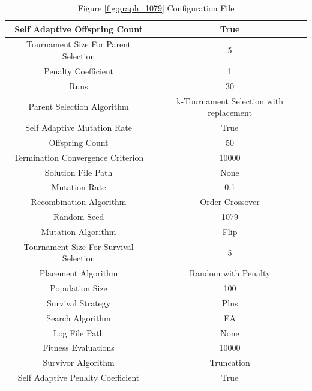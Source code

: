 \documentclass{standalone}
\begin{document}
\begin{table}[!htb]
	\centering
	\caption{Figure \ref{fig:graph_1079} Configuration File}
	\label{tab:graph_1079}
	\begin{tabular}{| c | c |}
		\hline
		Self Adaptive Offspring Count		& True		 \\
		\hline
		Tournament Size For Parent Selection		& 5		 \\
		\hline
		Penalty Coefficient		& 1		 \\
		\hline
		Runs		& 30		 \\
		\hline
		Parent Selection Algorithm		& k-Tournament Selection with replacement		 \\
		\hline
		Self Adaptive Mutation Rate		& True		 \\
		\hline
		Offspring Count		& 50		 \\
		\hline
		Termination Convergence Criterion		& 10000		 \\
		\hline
		Solution File Path		& None		 \\
		\hline
		Mutation Rate		& 0.1		 \\
		\hline
		Recombination Algorithm		& Order Crossover		 \\
		\hline
		Random Seed		& 1079		 \\
		\hline
		Mutation Algorithm		& Flip		 \\
		\hline
		Tournament Size For Survival Selection		& 5		 \\
		\hline
		Placement Algorithm		& Random with Penalty		 \\
		\hline
		Population Size		& 100		 \\
		\hline
		Survival Strategy		& Plus		 \\
		\hline
		Search Algorithm		& EA		 \\
		\hline
		Log File Path		& None		 \\
		\hline
		Fitness Evaluations		& 10000		 \\
		\hline
		Survivor Algorithm		& Truncation		 \\
		\hline
		Self Adaptive Penalty Coefficient		& True		 \\
		\hline
	\end{tabular}
\end{table}
\end{document}
